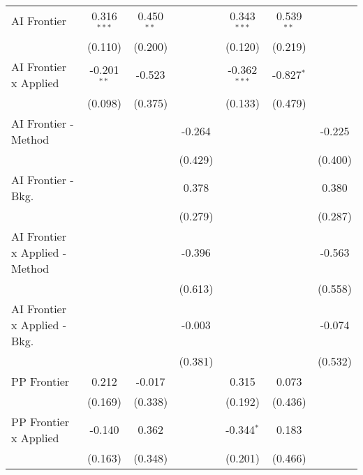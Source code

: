 \begin{tabular}{lcccccc}
   AI Frontier                    & 0.316$^{***}$ & 0.450$^{**}$ &              & 0.343$^{***}$  & 0.539$^{**}$ &   \\   
                                  & (0.110)       & (0.200)      &              & (0.120)        & (0.219)      &   \\   
   AI Frontier x Applied          & -0.201$^{**}$ & -0.523       &              & -0.362$^{***}$ & -0.827$^{*}$ &   \\   
                                  & (0.098)       & (0.375)      &              & (0.133)        & (0.479)      &   \\   
   AI Frontier - Method           &               &              & -0.264       &                &              & -0.225\\   
                                  &               &              & (0.429)      &                &              & (0.400)\\   
   AI Frontier - Bkg.             &               &              & 0.378        &                &              & 0.380\\   
                                  &               &              & (0.279)      &                &              & (0.287)\\   
   AI Frontier x Applied - Method &               &              & -0.396       &                &              & -0.563\\   
                                  &               &              & (0.613)      &                &              & (0.558)\\   
   AI Frontier x Applied - Bkg.   &               &              & -0.003       &                &              & -0.074\\   
                                  &               &              & (0.381)      &                &              & (0.532)\\   
   PP Frontier                    & 0.212         & -0.017       &              & 0.315          & 0.073        &   \\   
                                  & (0.169)       & (0.338)      &              & (0.192)        & (0.436)      &   \\   
   PP Frontier x Applied          & -0.140        & 0.362        &              & -0.344$^{*}$   & 0.183        &   \\   
                                  & (0.163)       & (0.348)      &              & (0.201)        & (0.466)      &   \\   

\end{tabular}
